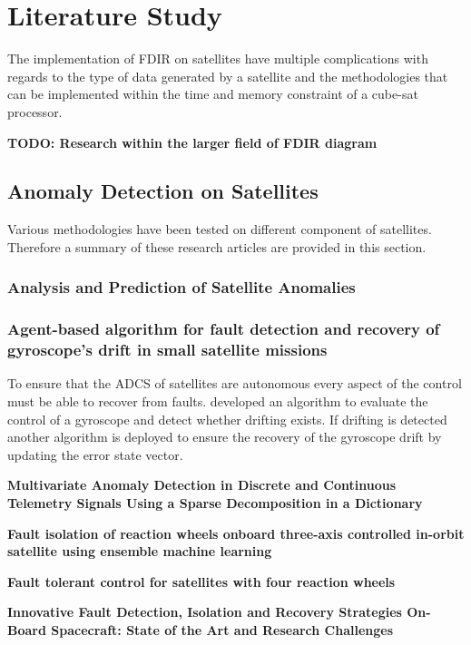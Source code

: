 \chapter{Literature Study}
\label{chap:Literature Study}

The implementation of FDIR on satellites have multiple complications with regards to the type of data generated by a satellite and the methodologies that can be implemented within the time and memory constraint of a cube-sat processor.

\textbf{TODO: Research within the larger field of FDIR diagram}

\section{Anomaly Detection on Satellites}
Various methodologies have been tested on different component of satellites. Therefore a summary of these research articles are provided in this section.

\subsection{Analysis and Prediction of Satellite Anomalies}

\subsection{Agent-based algorithm for fault detection and recovery of gyroscope's drift in small satellite missions}
To ensure that the ADCS of satellites are autonomous every aspect of the control must be able to recover from faults. \cite{carvajal2017agent} developed an algorithm to evaluate the control of a gyroscope and detect whether drifting exists. If drifting is detected another algorithm is deployed to ensure the recovery of the gyroscope drift by updating the error state vector.

\textbf{Multivariate Anomaly Detection in Discrete and Continuous Telemetry Signals Using a Sparse Decomposition in a Dictionary}
\cite{Pilastre2020}

\textbf{Fault isolation of reaction wheels onboard three-axis controlled in-orbit satellite using ensemble machine learning}
\cite{rahimi2020fault}

\textbf{Fault tolerant control for satellites with four reaction wheels}
\cite{jin2008fault}

\textbf{Innovative Fault Detection, Isolation and Recovery Strategies On-Board Spacecraft: State of the Art and Research Challenges}
\cite{wander2013innovative}

